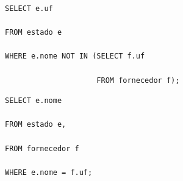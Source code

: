 \documentclass[12pt, addpoints]{exam}
\begin{document}
\begin{questions}
\begin{choices}
\choice \begin{verbatim}SELECT e.uf

FROM estado e

WHERE e.nome NOT IN (SELECT f.uf

                     FROM fornecedor f);

\end{verbatim}
\choice \begin{verbatim}SELECT e.nome

FROM estado e,

FROM fornecedor f

WHERE e.nome = f.uf;

\end{verbatim}


\end{choices}



    \end{questions}
    
\end{document}

